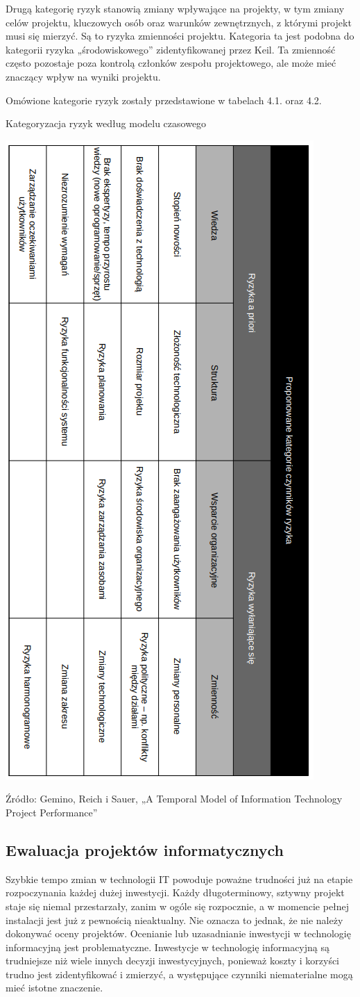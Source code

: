 Drugą kategorię ryzyk stanowią zmiany wpływające na projekty, w tym zmiany celów projektu, kluczowych osób oraz warunków zewnętrznych, z którymi projekt musi się mierzyć. Są to ryzyka zmienności projektu. \autocite{gemino} Kategoria ta jest podobna do kategorii ryzyka „środowiskowego” zidentyfikowanej przez Keil. \autocite{keil} Ta zmienność często pozostaje poza kontrolą członków zespołu projektowego, ale może mieć znaczący wpływ na wyniki projektu. \autocite{ryzyka}

Omówione kategorie ryzyk zostały przedstawione w tabelach 4.1. oraz 4.2.

\begin{table}
    \caption{Kategoryzacja ryzyk według modelu czasowego}
    \centering
    \includegraphics[width=0.5\linewidth]{img/ryzyka3.png}
    \caption*{Źródło: Gemino, Reich i Sauer, „A Temporal Model of Information Technology Project Performance” }
  \end{table}

\subsection{Ewaluacja projektów informatycznych}
Szybkie tempo zmian w technologii IT powoduje poważne trudności już na etapie rozpoczynania każdej dużej inwestycji. Każdy długoterminowy, sztywny projekt staje się niemal przestarzały, zanim w ogóle się rozpocznie, a w momencie pełnej instalacji jest już z pewnością nieaktualny. Nie oznacza to jednak, że nie należy dokonywać oceny projektów. Ocenianie lub uzasadnianie inwestycji w technologię informacyjną jest problematyczne. Inwestycje w technologię informacyjną są trudniejsze niż wiele innych decyzji inwestycyjnych, ponieważ koszty i korzyści trudno jest zidentyfikować i zmierzyć, a występujące czynniki niematerialne mogą mieć istotne znaczenie. \autocite{powell1992information}

